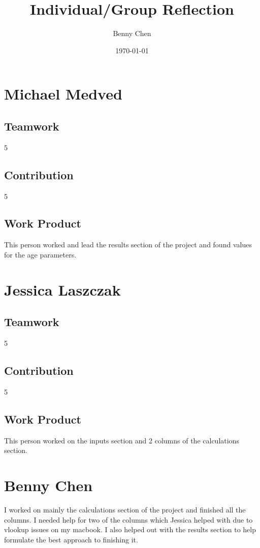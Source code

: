 \documentclass{article}
\title{Individual/Group Reflection}
\author{Benny Chen}
\date{\today}
\begin{document}
\maketitle

\section*{Michael Medved}
\subsection*{Teamwork}
5
\subsection*{Contribution}
5
\subsection*{Work Product}
This person worked and lead the results section of the project and found values for the age parameters.

\section*{Jessica Laszczak}
\subsection*{Teamwork}
5
\subsection*{Contribution}
5
\subsection*{Work Product}
This person worked on the inputs section and 2 columns of the calculations section.

\section*{Benny Chen}
I worked on mainly the calculations section of the project and finished all the columns. I needed help for two of the columns which Jessica helped with due to vlookup issues on my macbook. I also helped out with the results section to help formulate the best approach to finishing it.
\end{document}
